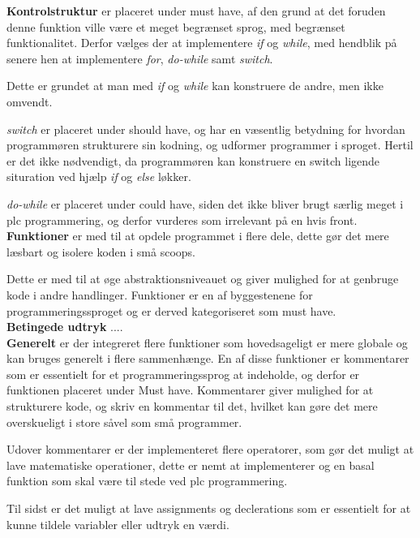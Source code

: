 \noindent\textbf{Kontrolstruktur}
er placeret under must have, af den grund at det foruden denne funktion ville være et meget begrænset sprog, med begrænset funktionalitet.
Derfor vælges der at implementere \textit{if} og \textit{while}, med hendblik på senere hen at implementere \textit{for}, \textit{do-while} samt \textit{switch}.

Dette er grundet at man med \textit{if} og \textit{while} kan konstruere de andre, men ikke omvendt.

\textit{switch} er placeret under should have, og har en væsentlig betydning for hvordan programmøren strukturere sin kodning, og udformer programmer i sproget.
Hertil er det ikke nødvendigt, da programmøren kan konstruere en switch ligende situration ved hjælp \textit{if} og \textit{else} løkker. 

\textit{do-while} er placeret under could have, siden det ikke bliver brugt særlig meget i \gls{plc} programmering, og derfor vurderes som irrelevant på en hvis front.\\

\noindent\textbf{Funktioner}
er med til at opdele programmet i flere dele, dette gør det mere læsbart og isolere koden i små scoops.

Dette er med til at øge abstraktionsniveauet og giver mulighed for at genbruge kode i andre handlinger.
Funktioner er en af byggestenene for programmeringssproget og er derved kategoriseret som must have.\\

\noindent\textbf{Betingede udtryk}
....
\\

\noindent\textbf{Generelt} er der integreret flere funktioner som hovedsageligt er mere globale og kan bruges generelt i flere sammenhænge. En af disse funktioner er kommentarer som er essentielt for et programmeringssprog at indeholde, og derfor er funktionen placeret under Must have. Kommentarer giver mulighed for at strukturere kode, og skriv en kommentar til det, hvilket kan gøre det mere overskueligt i store såvel som små programmer.

Udover kommentarer er der implementeret flere operatorer, som gør det muligt at lave matematiske operationer, dette er nemt at implementerer og en basal funktion som skal være til stede ved \gls{plc} programmering.

Til sidst er det muligt at lave assignments og declerations som er essentielt for at kunne tildele variabler eller udtryk en værdi.


